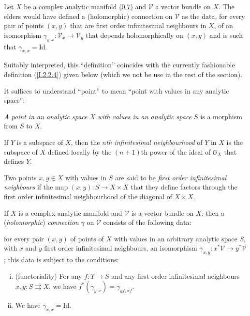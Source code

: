 \documentclass{report}
\theoremstyle{plain}
\theoremstyle{definition}
\newenvironment{env}[1]
    {\renewcommand\theinnercustomenv{#1}\innercustomenv}
    {\endinnercustomenv}
\newcommand{\sh}{\mathscr}
\newcommand{\id}{\mathrm{Id}}
\newcommand{\oldpage}[1]{\marginpar{\footnotesize$\Big\vert$ \textit{p.~#1}}}
\begin{document}
\begin{env}{2.2}
\label{I.2.2}
  Let $X$ be a complex analytic manifold \hyperref[0.7]{(0.7)} and $\sh{V}$ a vector bundle on $X$.
  The elders would have defined a (holomorphic) connection on $\sh{V}$ as the data, for every pair of points $(x,y)$ that are first order infinitesimal neighbours in $X$, of an isomorphism $\gamma_{y,x}\colon\sh{V}_x\to\sh{V}_y$ that depends holomorphically on $(x,y)$ and is such that $\gamma_{x,x}=\id$.

  Suitably interpreted, this ``definition'' coincides with the currently fashionable definition (\cref{I.2.2.4}) given below (which we not be use in the rest of the section).

  It suffices to understand ``point'' to mean ``point with values in any analytic space'':

\oldpage{6}
  \begin{env}{2.2.1}
  \label{I.2.2.1}
    \emph{A point in an analytic space $X$ with values in an analytic space $S$} is a morphism from $S$ to $X$.
  \end{env}

  \begin{env}{2.2.2}
  \label{I.2.2.2}
    If $Y$ is a subspace of $X$, then the \emph{$n$th infinitesimal neighbourhood} of $Y$ in $X$ is the subspace of $X$ defined locally by the $(n+1)$th power of the ideal of $\sh{O}_X$ that defines $Y$.
  \end{env}

  \begin{env}{2.2.3}
  \label{I.2.2.3}
    Two points $x,y\in X$ with values in $S$ are said to be \emph{first order infinitesimal neighbours} if the map $(x,y)\colon S\to X\times X$ that they define factors through the first order infinitesimal neighbourhood of the diagonal of $X\times X$.
  \end{env}

  \begin{env}{2.2.4}
  \label{I.2.2.4}
    If $X$ is a complex-analytic manifold and $\sh{V}$ is a vector bundle on $X$, then a (\emph{holomorphic}) \emph{connection} $\gamma$ on $\sh{V}$ consists of the following data:

    for every pair $(x,y)$ of points of $X$ with values in an arbitrary analytic space $S$, with $x$ and $y$ first order infinitesimal neighbours, an isomorphism $\gamma_{x,y}\colon x^*\sh{V}\to y^*\sh{V}$;
    this data is subject to the conditions:
    \begin{enumerate}[(i)]
      \item (functoriality) For any $f\colon T\to S$ and any first order infinitesimal neighbours $x,y\colon S\rightrightarrows X$, we have $f^*(\gamma_{y,x})=\gamma_{yf,xf}$.
      \item We have $\gamma_{x,x}=\id$.
    \end{enumerate}
  \end{env}
\end{env}



\nocite{*}

\end{document}
